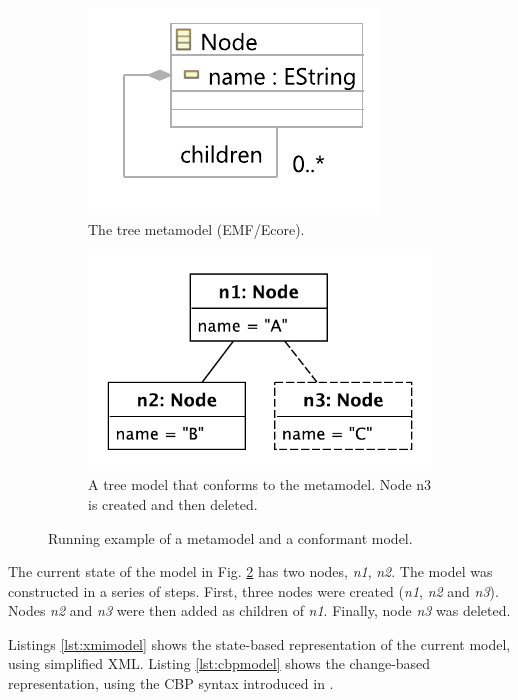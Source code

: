 \documentclass{llncs}
\begin{document}
    \begin{figure}[ht]
\begin{subfigure}[t]{0.4\linewidth}
    \centering
    \includegraphics[width=0.8\linewidth]{node_metamodel}
    \caption{The tree metamodel (EMF/Ecore).}
    \label{fig:tree_metamodel}
\end{subfigure}
\hfill
\begin{subfigure}[t]{0.6\linewidth}
    \centering
    \includegraphics[width=0.6\linewidth]{initial_chart}
    \caption{A tree model that conforms to the  metamodel.  Node n3 is created and then deleted.}
    \label{fig:initial_model}
\end{subfigure}
\caption{Running example of a metamodel and a conformant model.}
\label{fig:append_speed}
    \end{figure}
    
    The current state of the model in Fig. \ref{fig:initial_model} has two nodes, \emph{n1}, \emph{n2}.  The model was constructed in a series of steps.  First, three nodes were created (\emph{n1}, \emph{n2} and \emph{n3}).
    Nodes \emph{n2} and \emph{n3} were then added as children of \emph{n1}.
    Finally, node \emph{n3} was deleted.
    
    Listings \ref{lst:xmimodel} shows the state-based representation of the current model, using simplified XML.  Listing \ref{lst:cbpmodel} shows the change-based representation, using the CBP syntax introduced in \cite{yohannis2017turning}.
    
\end{document}
